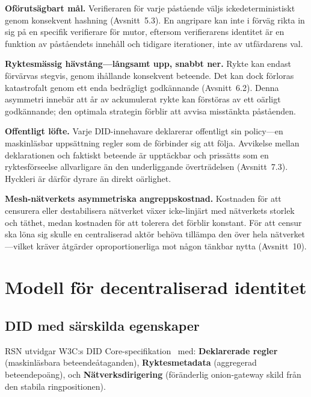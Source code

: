 \documentclass[11pt,a4paper,twocolumn]{article}
\begin{document}
\textbf{Oförutsägbart mål.} Verifieraren för varje påstående väljs ickedeterministiskt genom konsekvent hashning (Avsnitt~5.3). En angripare kan inte i förväg rikta in sig på en specifik verifierare för mutor, eftersom verifierarens identitet är en funktion av påståendets innehåll och tidigare iterationer, inte av utfärdarens val.

\textbf{Ryktesmässig hävstång---långsamt upp, snabbt ner.} Rykte kan endast förvärvas stegvis, genom ihållande konsekvent beteende. Det kan dock förloras katastrofalt genom ett enda bedrägligt godkännande (Avsnitt~6.2). Denna asymmetri innebär att år av ackumulerat rykte kan förstöras av ett oärligt godkännande; den optimala strategin förblir att avvisa misstänkta påståenden.

\textbf{Offentligt löfte.} Varje DID-innehavare deklarerar offentligt sin policy---en maskinläsbar uppsättning regler som de förbinder sig att följa. Avvikelse mellan deklarationen och faktiskt beteende är upptäckbar och prissätts som en ryktesförseelse allvarligare än den underliggande överträdelsen (Avsnitt~7.3). Hyckleri är därför dyrare än direkt oärlighet.

\textbf{Mesh-nätverkets asymmetriska angreppskostnad.} Kostnaden för att censurera eller destabilisera nätverket växer icke-linjärt med nätverkets storlek och täthet, medan kostnaden för att tolerera det förblir konstant. För att censur ska löna sig skulle en centraliserad aktör behöva tillämpa den över hela nätverket---vilket kräver åtgärder oproportionerliga mot någon tänkbar nytta (Avsnitt~10).

\section{Modell för decentraliserad identitet}

\subsection{DID med särskilda egenskaper}

RSN utvidgar W3C:s DID Core-specifikation~\cite{did2022} med: \textbf{Deklarerade regler} (maskinläsbara beteendeåtaganden), \textbf{Ryktesmetadata} (aggregerad beteendepoäng), och \textbf{Nätverksdirigering} (föränderlig onion-gateway skild från den stabila ringpositionen).
\end{document}
